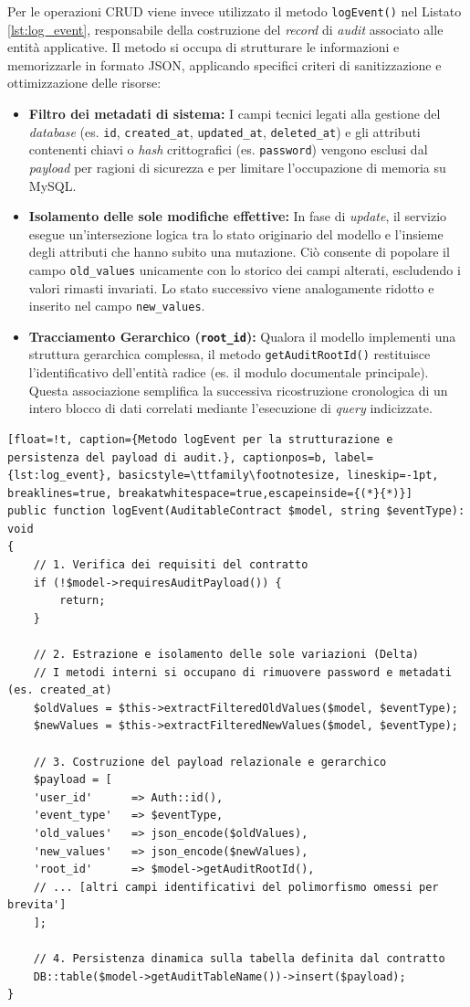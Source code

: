 Per le operazioni CRUD viene invece utilizzato il metodo \texttt{logEvent()} nel Listato \ref{lst:log_event}, responsabile della costruzione del \textit{record} di \textit{audit} associato alle entità applicative. Il metodo si occupa di strutturare le informazioni e memorizzarle in formato JSON, applicando specifici criteri di sanitizzazione e ottimizzazione delle risorse:
\begin{itemize}
	\item \textbf{Filtro dei metadati di sistema:} I campi tecnici legati alla gestione del \textit{database} (es. \texttt{id}, \texttt{created\_at}, \texttt{updated\_at}, \texttt{deleted\_at}) e gli attributi contenenti chiavi o \textit{hash} crittografici (es. \texttt{password}) vengono esclusi dal \textit{payload} per ragioni di sicurezza e per limitare l'occupazione di memoria su MySQL.
	\item \textbf{Isolamento delle sole modifiche effettive:} In fase di \textit{update}, il servizio esegue un'intersezione logica tra lo stato originario del modello e l'insieme degli attributi che hanno subito una mutazione. Ciò consente di popolare il campo \texttt{old\_values} unicamente con lo storico dei campi alterati, escludendo i valori rimasti invariati. Lo stato successivo viene analogamente ridotto e inserito nel campo \texttt{new\_values}.
	\item \textbf{Tracciamento Gerarchico (\texttt{root\_id}):} Qualora il modello implementi una struttura gerarchica complessa, il metodo \texttt{getAuditRootId()} restituisce l'identificativo dell'entità radice (es. il modulo documentale principale). Questa associazione semplifica la successiva ricostruzione cronologica di un intero blocco di dati correlati mediante l'esecuzione di \textit{query} indicizzate.
\end{itemize}

\begin{lstlisting}[float=!t, caption={Metodo logEvent per la strutturazione e persistenza del payload di audit.}, captionpos=b, label={lst:log_event}, basicstyle=\ttfamily\footnotesize, lineskip=-1pt, breaklines=true, breakatwhitespace=true,escapeinside={(*}{*)}]
public function logEvent(AuditableContract $model, string $eventType): void
{
	// 1. Verifica dei requisiti del contratto
	if (!$model->requiresAuditPayload()) {
		return;
	}
	
	// 2. Estrazione e isolamento delle sole variazioni (Delta)
	// I metodi interni si occupano di rimuovere password e metadati (es. created_at)
	$oldValues = $this->extractFilteredOldValues($model, $eventType);
	$newValues = $this->extractFilteredNewValues($model, $eventType);
	
	// 3. Costruzione del payload relazionale e gerarchico
	$payload = [
	'user_id'      => Auth::id(),
	'event_type'   => $eventType,
	'old_values'   => json_encode($oldValues),
	'new_values'   => json_encode($newValues),
	'root_id'      => $model->getAuditRootId(),
	// ... [altri campi identificativi del polimorfismo omessi per brevita']
	];
	
	// 4. Persistenza dinamica sulla tabella definita dal contratto
	DB::table($model->getAuditTableName())->insert($payload);
}
\end{lstlisting}

